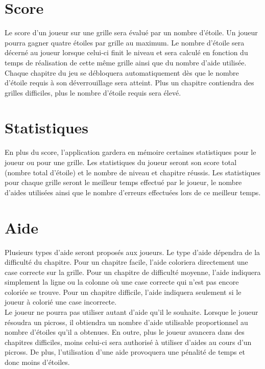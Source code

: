 \documentclass{report}
\begin{document}
		\section{Score}
			Le score d'un joueur sur une grille sera évalué par un nombre d'étoile. Un joueur pourra gagner quatre étoiles par grille au maximum. Le nombre d'étoile sera décerné au joueur lorsque celui-ci finit le niveau et sera calculé en fonction du temps de réalisation de cette même grille ainsi que du nombre d'aide utilisée. Chaque chapitre du jeu se débloquera automatiquement dès que le nombre d'étoile requis à son déverrouillage sera atteint. Plus un chapitre contiendra des grilles difficiles, plus le nombre d'étoile requis sera élevé.
				
		\section{Statistiques}
			En plus du score, l'application gardera en mémoire certaines statistiques pour le joueur ou pour une grille. Les statistiques du joueur seront son score total (nombre total d'étoile) et le nombre de niveau et chapitre réussis. Les statistiques pour chaque grille seront le meilleur temps effectué par le joueur, le nombre d'aides utilisées ainsi que le nombre d'erreurs effectuées lors de ce meilleur temps.
			
		\section{Aide}
			Plusieurs types d'aide seront proposés aux joueurs. Le type d'aide dépendra de la difficulté du chapitre. Pour un chapitre facile, l'aide coloriera directement une case correcte sur la grille. Pour un chapitre de difficulté moyenne, l'aide indiquera simplement la ligne ou la colonne où une case correcte qui n'est pas encore coloriée se trouve. Pour un chapitre difficile, l'aide indiquera seulement si le joueur à colorié une case incorrecte.\\
			Le joueur ne pourra pas utiliser autant d'aide qu'il le souhaite. Lorsque le joueur résoudra un picross, il obtiendra un nombre d'aide utilisable proportionnel au nombre d'étoiles qu'il a obtenues. En outre, plus le joueur avancera dans des chapitres difficiles, moins celui-ci sera authorisé à utiliser d'aides au cours d'un picross. De plus, l'utilisation d'une aide provoquera une pénalité de temps et donc moins d'étoiles. 
\end{document}
